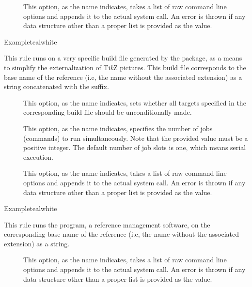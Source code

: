 \begin{description}
\begin{description}
\item[] This option, as the name indicates, takes a list of raw command line options and appends it to the actual system call. An error is thrown if any data structure other than a proper list is provided as the value.
\end{description}

\begin{codebox}{Example}{teal}{\icnote}{white}
\end{codebox}

\item[\rulebox{tikzmake}]
This rule runs  on a very specific build file generated by the  package, as a means to simplify the externalization of Ti{\itshape k}Z pictures. This build file corresponds to the base name of the  reference (i.e, the name without the associated extension) as a string concatenated with the  suffix.

\begin{description}
\item[] This option, as the name indicates, sets whether all targets specified in the corresponding build file should be unconditionally made.

\item[] This option, as the name indicates, specifies the number of jobs (commands) to run simultaneously. Note that the provided value must be a positive integer. The default number of job slots is one, which means serial execution.

\item[] This option, as the name indicates, takes a list of raw command line options and appends it to the actual system call. An error is thrown if any data structure other than a proper list is provided as the value.
\end{description}

\begin{codebox}{Example}{teal}{\icnote}{white}
\end{codebox}

\item[\rulebox{upbibtex}]
This rule runs the  program, a reference management software, on the corresponding base name of the  reference (i.e, the name without the associated extension) as a string.

\begin{description}
\item[] This option, as the name indicates, takes a list of raw command line options and appends it to the actual system call. An error is thrown if any data structure other than a proper list is provided as the value.
\end{description}


\end{description}
